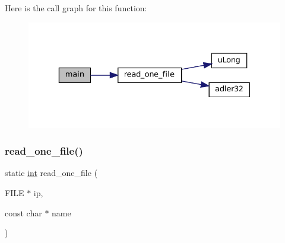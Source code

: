 Here is the call graph for this function\+:
\nopagebreak
\begin{figure}[H]
\begin{center}
\leavevmode
\includegraphics[width=329pt]{checksum-icc_8c_a3c04138a5bfe5d72780bb7e82a18e627_cgraph}
\end{center}
\end{figure}
\mbox{\label{checksum-icc_8c_a331b9d633652d9d4ec772d508909a64b}} 
\subsubsection{\texorpdfstring{read\+\_\+one\+\_\+file()}{read\_one\_file()}}
{\footnotesize\ttfamily static \mbox{\hyperlink{ioapi_8h_a787fa3cf048117ba7123753c1e74fcd6}{int}} read\+\_\+one\+\_\+file (\begin{DoxyParamCaption}\item[{F\+I\+LE $\ast$}]{ip,  }\item[{const char $\ast$}]{name }\end{DoxyParamCaption})\hspace{0.3cm}{\ttfamily [static]}}

